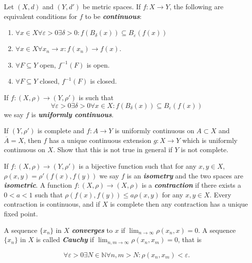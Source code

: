 \documentclass{article}
\theoremstyle{definition}
\newcommand{\N}{\mathbb{N}}
\begin{document}
	\begin{thm}Let $(X,d)$ and $(Y,d')$ be metric spaces. If $f:X\to Y$, the following are equivalent conditions for $f$ to be \textbf{\textit{continuous}}:
		\begin{enumerate}
			\item $\forall x\in X\forall\varepsilon>0\exists\delta>0:f(B_\delta(x))\subseteq B_\varepsilon(f(x))$
			\item $\forall x\in X\forall x_n\to x:f(x_n)\to f(x)$.
			\item $\forall F\subseteq Y$ open, $f^{-1}(F)$ is open.
			\item $\forall F\subseteq Y$ closed, $f^{-1}(F)$ is closed.
		\end{enumerate}
	\end{thm}
	If $f:(X,\rho)\to(Y,\rho')$ is such that
	\[\forall\varepsilon>0\exists\delta>0\forall x\in X:f(B_\delta(x))\subseteq B_\varepsilon(f(x))\]
	we say $f$ is \textbf{\textit{uniformly continuous}}.
	\begin{exer*}
		If $(Y,\rho')$ is complete and $f:A\to Y$ is uniformly continuous on $A\subset X$ and $\overline{A}=X$, then $f$ has a unique continuous extension $g:X\to Y$ which is uniformly continuous on $X$. Show that this is not true in general if $Y$ is not complete.
	\end{exer*}
	If $f:(X,\rho)\to(Y,\rho')$ is a bijective function such that for any $x,y\in X$, $\rho(x,y)=\rho'(f(x),f(y))$ we say $f$ is an \textbf{\textit{isometry}} and the two spaces are \textbf{\textit{isometric}}. A function $f:(X,\rho)\to (X,\rho)$ is a \textbf{\textit{contraction}} if there exists a $0<a<1$ such that $\rho(f(x),f(y))\leq a\rho(x,y)$ for any $x,y\in X$. Every contraction is continuous, and if $X$ is complete then any contraction has a unique fixed point.
	
	A sequence $\{x_n\}$ in $X$ \textbf{\textit{converges}} to $x$ if $\lim_{n\to\infty}\rho(x_n,x)=0$. A sequence $\{x_n\}$ in $X$ is called \textbf{\textit{Cauchy}} if $\lim_{n,m\to\infty}\rho(x_n,x_m)=0$, that is
	
	\[\forall\varepsilon>0\exists N\in\N\forall n,m>N:\rho(x_n,x_m)<\varepsilon.\]
	
\end{document}

